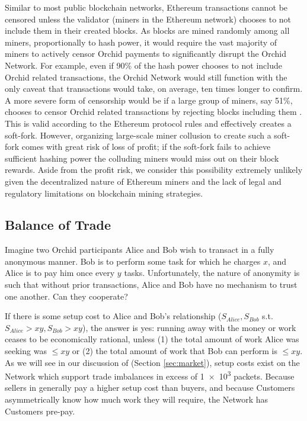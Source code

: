 Similar to most public blockchain networks, Ethereum transactions cannot be censored unless the validator (miners in the Ethereum network) chooses to not include them in their created blocks. As blocks are mined randomly among all miners, proportionally to hash power, it would require the vast majority of miners to actively censor Orchid payments to significantly disrupt the Orchid Network. For example, even if 90\% of the hash power chooses to not include Orchid related transactions, the Orchid Network would still function with the only caveat that transactions would take, on average, ten times longer to confirm. A more severe form of censorship would be if a large group of miners, say 51\%, chooses to censor Orchid related transactions by rejecting blocks including them \cite{BitcoinEconomics}. This is valid according to the Ethereum protocol rules and effectively creates a soft-fork. However, organizing large-scale miner collusion to create such a soft-fork comes with great risk of loss of profit; if the soft-fork fails to achieve sufficient hashing power the colluding miners would miss out on their block rewards. Aside from the profit risk, we consider this possibility extremely unlikely given the decentralized nature of Ethereum miners and the lack of legal and regulatory limitations on blockchain mining strategies.

\subsection{Balance of Trade}
\label{tokens-bot}

Imagine two Orchid participants Alice and Bob wish to transact in a fully anonymous manner. Bob is to perform some task for which he charges $x$, and Alice is to pay him once every $y$ tasks. Unfortunately, the nature of anonymity is such that without prior transactions, Alice and Bob have no mechanism to trust one another. Can they cooperate?

If there is some setup cost to Alice and Bob's relationship ($S_{Alice}, S_{Bob}$ s.t. $S_{Alice} > xy, S_{Bob} > xy$), the answer is yes: running away with the money or work ceases to be economically rational, unless (1) the total amount of work Alice was seeking was $\leq xy$ or (2) the total amount of work that Bob can perform is $\leq xy$. As we will see in our discussion of \tOM{} (Section \ref{sec:market}), setup costs exist on the \Orchid{} Network which support trade imbalances in excess of \num{1e3} packets. Because sellers in \tOM{} generally pay a higher setup cost than buyers, and because Customers asymmetrically know how much work they will require, the \Orchid{} Network has Customers pre-pay.

